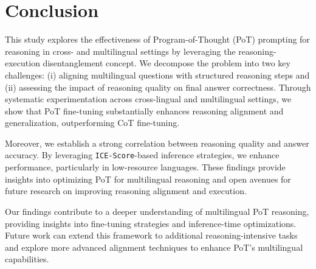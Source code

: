 \section{Conclusion}

This study explores the effectiveness of Program-of-Thought (PoT) prompting for reasoning in cross- and multilingual settings by leveraging the reasoning-execution disentanglement concept.
%
We decompose the problem into two key challenges: (i) aligning multilingual questions with structured reasoning steps and (ii) assessing the impact of reasoning quality on final answer correctness.
%
Through systematic experimentation across cross-lingual and multilingual settings, we show that PoT fine-tuning substantially enhances reasoning alignment and generalization,
outperforming CoT fine-tuning.

Moreover, we establish a strong correlation between reasoning quality and answer accuracy. 
%
By leveraging \texttt{ICE-Score}-based inference strategies, we enhance performance,
particularly in low-resource languages. 
%
These findings provide insights into optimizing PoT for multilingual reasoning and open avenues for future research on improving reasoning alignment and execution.

Our findings contribute to a deeper understanding of multilingual PoT reasoning, providing insights into fine-tuning strategies and inference-time optimizations. 
%
Future work can extend this framework to additional reasoning-intensive tasks and explore more advanced alignment techniques to enhance PoT’s multilingual capabilities.



